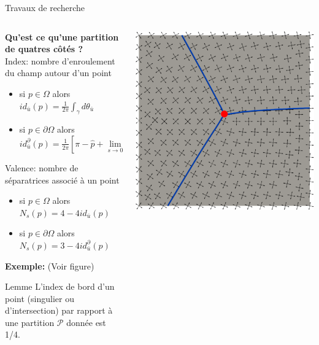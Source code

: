 \documentclass[compress,10pt,aspectratio=169]{beamer}
\begin{document}
\begin{frame}{Travaux de recherche}
\small
\vspace{-0.2cm}
  \begin{columns}
    \begin{column}{0.7\textwidth}
{\bf Qu'est ce qu'une partition de quatres côtés ?}\\\vspace{0.2cm}
    {\color{onera} Index:} nombre d'enroulement du champ autour d'un point
\begin{itemize}
    \item si $p\in\Omega$ alors $id_{\bar{u}}(p) = \frac{1}{2\pi}\int_\gamma d\theta_{\bar{u}}$
    \item si $p\in\partial\Omega$ alors $id^\partial_{\bar{u}}(p)=\frac{1}{2\pi}\left[\pi-\hat{p}+\lim\limits_{s\rightarrow 0}\int_s^{1-s}d\theta_{\bar{u}}^\gamma\right]$
\end{itemize}
{\color{onera} Valence:} nombre de séparatrices associé à un point
\begin{itemize}
    \item si $p\in\Omega$ alors $N_s(p) = 4-4id_{\bar{u}}(p)$
    \item si $p\in\partial\Omega$ alors $N_s(p) = 3-4id^\partial_{\bar{u}}(p)$
\end{itemize}
{\bf Exemple:} (Voir figure)\\\vspace{0.1cm}
\begin{onerablock}{\small  Lemme}
    \small L'index de bord d'un point (singulier ou d'intersection) par rapport à une partition $\mathcal{P}$ donnée est 1/4.
\end{onerablock}
    \end{column}
    \begin{column}{0.3\textwidth}
        \centering
  \includegraphics[scale=0.1]{images/sepa_3.pdf}

\end{column}
\end{columns}
\end{frame}
\end{document}
